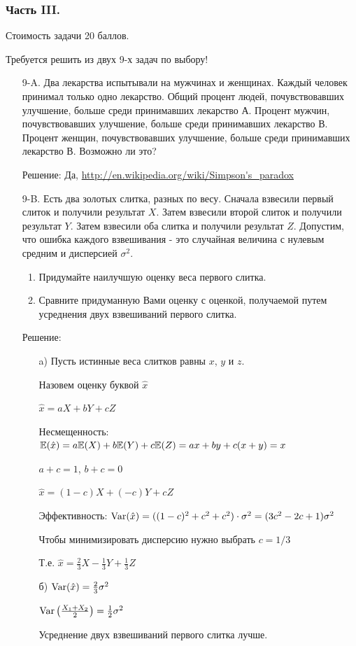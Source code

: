 \documentclass[12pt, a4paper]{article}\usepackage[]{graphicx}\usepackage[]{color}
\begin{document}
\subsubsection*{Часть III.}

Стоимость задачи 20 баллов.

Требуется решить \textbf{} из двух 9-х задач по
выбору!

\begin{enumerate}
\item[9-A.] Два лекарства испытывали на мужчинах и женщинах. Каждый
человек принимал только одно лекарство. Общий процент людей,
почувствовавших улучшение, больше среди принимавших лекарство А.
Процент мужчин, почувствовавших улучшение, больше среди принимавших лекарство В. Процент женщин, почувствовавших улучшение, больше среди принимавших лекарство В. Возможно ли это?

Решение: Да, \url{http://en.wikipedia.org/wiki/Simpson's_paradox}

\item[9-B.] Есть два золотых слитка, разных по весу. Сначала взвесили первый слиток и получили результат $X$. Затем взвесили второй слиток и получили результат $Y$. Затем взвесили оба слитка и получили результат $Z$. Допустим, что ошибка каждого взвешивания - это случайная величина с нулевым средним и дисперсией $\sigma^{2}$.
\begin{enumerate}
\item Придумайте наилучшую оценку веса первого слитка.
\item Сравните придуманную Вами оценку с оценкой, получаемой путем усреднения двух взвешиваний первого слитка.
\end{enumerate}
Решение:
\begin{enumerate}
\item[a)] Пусть истинные веса слитков равны $x$, $y$ и $z$.

Назовем оценку буквой $\hat{x}$

$\hat{x}=aX+bY+cZ$

Несмещенность: $\mathbb{E}(\hat{x})=a\mathbb{E}(X)+b\mathbb{E}(Y)+c\mathbb{E}(Z)=ax+by+c(x+y)=x$

$a+c=1$, $b+c=0$

$\hat{x}=(1-c)X+(-c)Y+cZ$

Эффективность: $\operatorname{Var}(\hat{x})=((1-c)^{2}+c^{2}+c^{2})\cdot \sigma^{2}=(3c^{2}-2c+1)\sigma^{2}$

Чтобы минимизировать дисперсию нужно выбрать $c=1/3$

Т.е. $\hat{x}=\frac{2}{3}X-\frac{1}{3}Y+\frac{1}{3}Z$
\item[б)] $\operatorname{Var}(\hat{x})=\frac{2}{3}\sigma^{2}$

$\operatorname{Var}\left(\frac{X_{1}+X_{2}}{2}\right)=\frac{1}{2}\sigma^{2}$

Усреднение двух взвешиваний первого слитка лучше.
\end{enumerate}
\end{enumerate}
\end{document}

